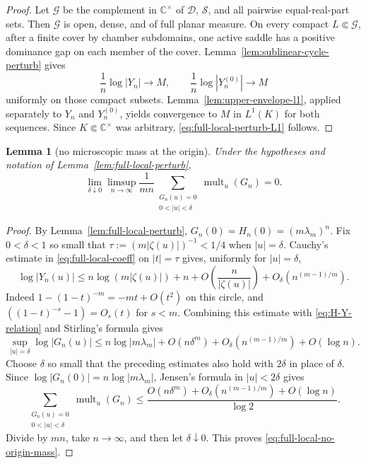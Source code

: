 \documentclass[reqno]{article}
\newtheorem{lem}[theorem]{Lemma}
\theoremstyle{definition}
\theoremstyle{remark}
\theoremstyle{plain}
\newcommand{\C}{\mathbb C}
\begin{document}
\begin{proof}
Let $\mathcal G$ be the complement in $\C^\times$ of $\mathcal D$, $\mathcal S$, and all pairwise equal-real-part sets. Then $\mathcal G$ is open, dense, and of full planar measure. On every compact $L\Subset\mathcal G$, after a finite cover by chamber subdomains, one active saddle has a positive dominance gap on each member of the cover. Lemma~\ref{lem:sublinear-cycle-perturb} gives
\[
\frac1n\log|Y_n|\to M,
\qquad
\frac1n\log|Y_n^{(0)}|\to M
\]
uniformly on those compact subsets. Lemma~\ref{lem:upper-envelope-l1}, applied separately to $Y_n$ and $Y_n^{(0)}$, yields convergence to $M$ in $L^1(K)$ for both sequences. Since $K\Subset\C^\times$ was arbitrary, \eqref{eq:full-local-perturb-L1} follows.
\end{proof}

\begin{lem}[no microscopic mass at the origin]\label{lem:full-local-no-origin}
Under the hypotheses and notation of Lemma~\ref{lem:full-local-perturb},
\begin{equation}\label{eq:full-local-no-origin-mass}
\lim_{\delta\downarrow0}\limsup_{n\to\infty}
\frac1{mn}\sum_{\substack{G_n(u)=0\\0<|u|<\delta}}
\operatorname{mult}_u(G_n)=0.
\end{equation}
\end{lem}

\begin{proof}
By Lemma~\ref{lem:full-local-perturb}, $G_n(0)=H_n(0)=(m\lambda_m)^n$. Fix $0<\delta<1$ so small that $\tau:=(m|\zeta(u)|)^{-1}<1/4$ when $|u|=\delta$. Cauchy's estimate in \eqref{eq:full-local-coeff} on $|t|=\tau$ gives, uniformly for $|u|=\delta$,
$$
\log|Y_n(u)|
\le n\log(m|\zeta(u)|)+n+O\!\left(\frac{n}{|\zeta(u)|}\right)+O_\delta\!\left(n^{(m-1)/m}\right).
$$
Indeed $1-(1-t)^{-m}=-mt+O(t^2)$ on this circle, and $((1-t)^{-s}-1)=O_s(t)$ for $s<m$. Combining this estimate with \eqref{eq:H-Y-relation} and Stirling's formula gives
$$
\sup_{|u|=\delta}\log|G_n(u)|
\le n\log|m\lambda_m|+O(n\delta^m)+O_\delta\!\left(n^{(m-1)/m}\right)+O(\log n).
$$
Choose $\delta$ so small that the preceding estimates also hold with $2\delta$ in place of $\delta$. Since $\log|G_n(0)|=n\log|m\lambda_m|$, Jensen's formula in $|u|<2\delta$ gives
$$
\sum_{\substack{G_n(u)=0\\0<|u|<\delta}}
\operatorname{mult}_u(G_n)
\le \frac{O(n\delta^m)+O_\delta(n^{(m-1)/m})+O(\log n)}{\log2}.
$$
Divide by $mn$, take $n\to\infty$, and then let $\delta\downarrow0$. This proves \eqref{eq:full-local-no-origin-mass}.
\end{proof}
\end{document}
